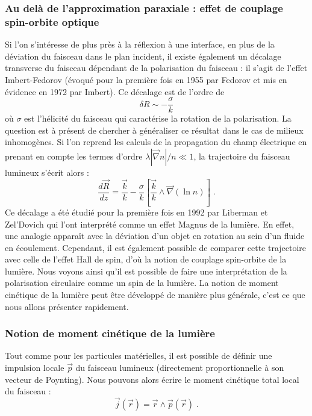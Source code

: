 \documentclass[a4paper,11pt]{article} %
\begin{document}
	\subsubsection{Au delà de l'approximation paraxiale : effet de couplage spin-orbite optique}
	
	Si l'on s'intéresse de plus près à la réflexion à une interface, en plus de la déviation du faisceau dans le plan incident, il existe également un décalage transverse du faisceau dépendant de la polarisation du faisceau : il s'agit de l'effet Imbert-Fedorov (évoqué pour la première fois en 1955 par Fedorov et mis en évidence en 1972 par Imbert). Ce décalage est de l'ordre de
	\begin{equation*}
		\delta R \sim - \frac{\sigma}{k}
	\end{equation*}
	où $ \sigma $ est l'hélicité du faisceau qui caractérise la rotation de la polarisation. La question est à présent de chercher à généraliser ce résultat dans le cas de milieux inhomogènes. Si l'on reprend les calculs de la propagation du champ électrique en prenant en compte les termes d'ordre $ \lambda | \vec{\nabla}n | / n \ll 1$, la trajectoire du faisceau lumineux s'écrit alors :
	\begin{equation}
		\frac{d \vec{R}}{dz} = \frac{\vec{k}}{k} - \frac{\sigma}{k} \left[ \frac{\vec{k}}{k} \wedge \vec{\nabla}(\ln n) \right] \; .
	\end{equation}
	Ce décalage a été étudié pour la première fois en 1992 par Liberman et Zel'Dovich qui l'ont interprété comme un effet Magnus de la lumière. En effet, une analogie apparaît avec la déviation d'un objet en rotation au sein d'un fluide en écoulement. Cependant, il est également possible de comparer cette trajectoire avec celle de l'effet Hall de spin, d'où la notion de couplage spin-orbite de la lumière. Nous voyons ainsi qu'il est possible de faire une interprétation de la polarisation circulaire comme un spin de la lumière. La notion de moment cinétique de la lumière peut être développé de manière plus générale, c'est ce que nous allons présenter rapidement.
	
	\subsubsection{Notion de moment cinétique de la lumière}
	Tout comme pour les particules matérielles, il est possible de définir une impulsion locale $ \vec{p} $ du faisceau lumineux (directement proportionnelle à son vecteur de Poynting). Nous pouvons alors écrire le moment cinétique total local du faisceau :
	\begin{equation*}
		\vec{j}(\vec{r}) = \vec{r} \wedge \vec{p}(\vec{r}) \; .
	\end{equation*}
	
\end{document}
